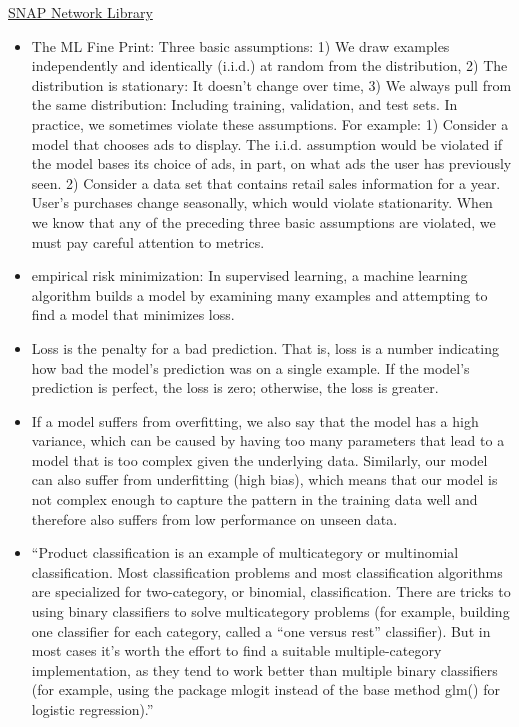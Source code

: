 \documentclass[]{book}
\begin{document}
\href{https://snap.stanford.edu/snappy/index.html}{SNAP Network Library}

\begin{itemize}
\item
  The ML Fine Print: Three basic assumptions: 1) We draw examples
  independently and identically (i.i.d.) at random from the
  distribution, 2) The distribution is stationary: It doesn't change
  over time, 3) We always pull from the same distribution: Including
  training, validation, and test sets. In practice, we sometimes violate
  these assumptions. For example: 1) Consider a model that chooses ads
  to display. The i.i.d. assumption would be violated if the model bases
  its choice of ads, in part, on what ads the user has previously seen.
  2) Consider a data set that contains retail sales information for a
  year. User's purchases change seasonally, which would violate
  stationarity. When we know that any of the preceding three basic
  assumptions are violated, we must pay careful attention to metrics.
\item
  empirical risk minimization: In supervised learning, a machine
  learning algorithm builds a model by examining many examples and
  attempting to find a model that minimizes loss.
\item
  Loss is the penalty for a bad prediction. That is, loss is a number
  indicating how bad the model's prediction was on a single example. If
  the model's prediction is perfect, the loss is zero; otherwise, the
  loss is greater.
\item
  If a model suffers from overfitting, we also say that the model has a
  high variance, which can be caused by having too many parameters that
  lead to a model that is too complex given the underlying data.
  Similarly, our model can also suffer from underfitting (high bias),
  which means that our model is not complex enough to capture the
  pattern in the training data well and therefore also suffers from low
  performance on unseen data.
\item
  ``Product classification is an example of multicategory or multinomial
  classification. Most classification problems and most classification
  algorithms are specialized for two-category, or binomial,
  classification. There are tricks to using binary classifiers to solve
  multicategory problems (for example, building one classifier for each
  category, called a ``one versus rest'' classifier). But in most cases
  it's worth the effort to find a suitable multiple-category
  implementation, as they tend to work better than multiple binary
  classifiers (for example, using the package mlogit instead of the base
  method glm() for logistic regression).''
\end{itemize}
\end{document}

